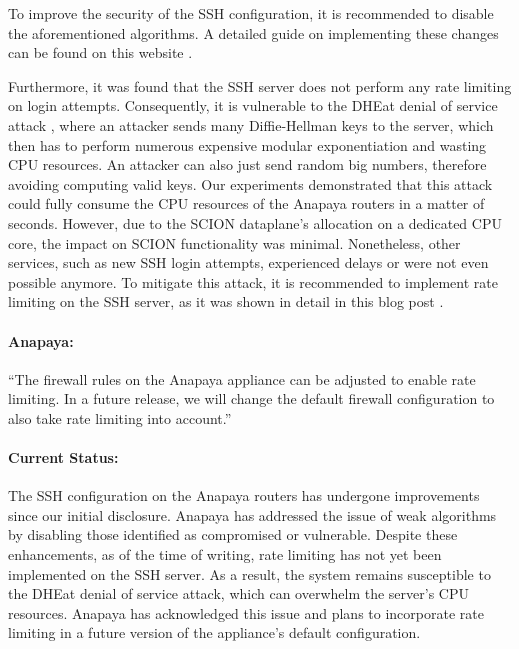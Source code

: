 To improve the security of the SSH configuration, it is recommended to disable the aforementioned algorithms.
A detailed guide on implementing these changes can be found on this website \cite{sshauditHardeningGuides}.


Furthermore, it was found that the SSH server does not perform any rate limiting on login attempts.
Consequently, it is vulnerable to the DHEat denial of service attack \cite{dheatAttack}, where an attacker sends many Diffie-Hellman keys to the server, which then has to perform numerous expensive modular exponentiation and wasting CPU resources.
An attacker can also just send random big numbers, therefore avoiding computing valid keys.
Our experiments demonstrated that this attack could fully consume the CPU resources of the Anapaya routers in a matter of seconds.
However, due to the SCION dataplane's allocation on a dedicated CPU core, the impact on SCION functionality was minimal.
Nonetheless, other services, such as new SSH login attempts, experienced delays or were not even possible anymore.
To mitigate this attack, it is recommended to implement rate limiting on the SSH server, as it was shown in detail in this blog post \cite{dheatAnalysis}.

\begin{boxH}
\paragraph{Anapaya:}
``The firewall rules on the Anapaya appliance can be adjusted to enable rate limiting. In a future release, we will change the default firewall configuration to also take rate limiting into account.''
\end{boxH}

\paragraph{Current Status:}
The SSH configuration on the Anapaya routers has undergone improvements since our initial disclosure.
Anapaya has addressed the issue of weak algorithms by disabling those identified as compromised or vulnerable.
Despite these enhancements, as of the time of writing, rate limiting has not yet been implemented on the SSH server.
As a result, the system remains susceptible to the DHEat denial of service attack, which can overwhelm the server's CPU resources.
Anapaya has acknowledged this issue and plans to incorporate rate limiting in a future version of the appliance's default configuration.


